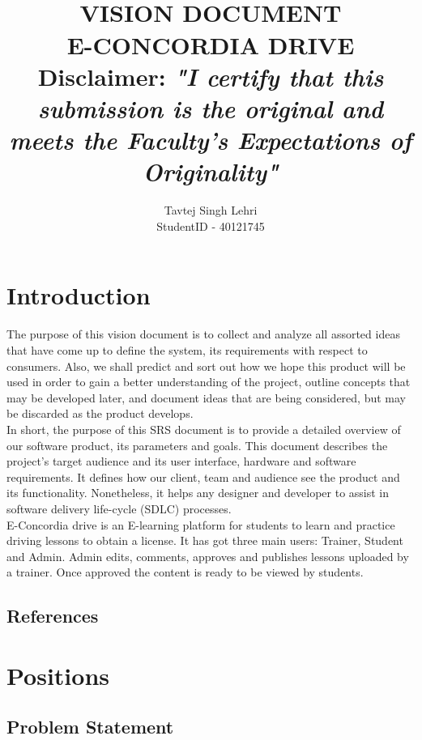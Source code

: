 \documentclass{article}
\title{\normalsize \texts{SOEN 6481 Summer 2021}\\ [1.0cm]
\large \textbf{\uppercase{Vision Document}}\\
\large \textbf{\uppercase{E-Concordia Drive}}
\normalsize \vspace*{2\baselineskip}\\
\textbf{Disclaimer:}
\textit{"I certify that this submission is the original and meets the Faculty's Expectations of Originality"}
}
\author{{Tavtej Singh Lehri}\\
{StudentID - 40121745}}
\begin{document}
\maketitle

\tableofcontents
\clearpage


\section{Introduction}
The purpose of this vision document is to collect and analyze all assorted ideas that have come up to define the system, its requirements with respect to consumers. Also, we shall predict and sort out how we hope this product will be used in order to gain a better understanding of the project, outline concepts that may be developed later, and document ideas that are being considered, but may be discarded as the product develops.\normalsize\vspace*{1\baselineskip}\\
In short, the purpose of this SRS document is to provide a detailed overview of our software product, its parameters and goals. This document describes the project's target audience and its user interface, hardware and software requirements. It defines how our client, team and audience see the product and its functionality. Nonetheless, it helps any designer and developer to assist in software delivery life-cycle (SDLC) processes.\normalsize\vspace*{1\baselineskip}\\
E-Concordia drive is an E-learning platform for students to learn and practice driving lessons to obtain a license. It has got three main users: Trainer, Student and Admin.
Admin edits, comments, approves and publishes  lessons uploaded by a trainer.
Once approved the content is ready to be viewed by students.

\subsection{References}


\section{Positions}

\subsection{Problem Statement}
\end{document}
